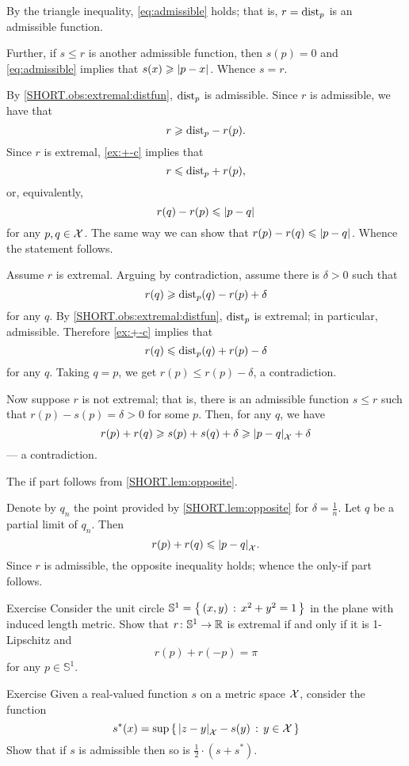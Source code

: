 By the triangle inequality, \ref{eq:admissible} holds;
that is, $r=\mathrm{dist}_p$ is an admissible function.

Further, if $s\le r$ is another admissible function, then $s(p)=0$ and \ref{eq:admissible} implies that $s(x)\z\ge\dist{p}{x}{}$.
Whence $s=r$.

By \ref{SHORT.obs:extremal:distfun}, $\mathrm{dist}_p$ is admissible.
Since $r$ is admissible, we have that
\[r\geqslant \mathrm{dist}_p-r(p).\]
Since $r$ is extremal, \ref{ex:+-c} implies that
\[r\leqslant \mathrm{dist}_p+r(p),\]
or, equivalently,
\[r(q)-r(p)\le \dist{p}{q}{}\]
for any $p,q\in\mathcal{X}$.
The same way we can show that
$r(p)-r(q)\le \dist{p}{q}{}$.
Whence the statement follows.

Assume $r$ is extremal.
Arguing by contradiction, assume there is $\delta>0$ such that
\[r(q)\geqslant \mathrm{dist}_p(q)-r(p)+\delta\]
for any $q$.
By \ref{SHORT.obs:extremal:distfun}, $\mathrm{dist}_p$ is extremal; in particular, admissible.
Therefore \ref{ex:+-c} implies that
\[r(q)\leqslant \mathrm{dist}_p(q)+r(p)-\delta\]
for any $q$.
Taking $q=p$, we get $r(p)\le r(p)-\delta$, a contradiction.

Now suppose $r$ is not extremal; that is, there is an admissible function $s\le r$ such that $r(p)-s(p)=\delta>0$ for some $p$.
Then, for any $q$, we have
\[r(p)+r(q)\ge s(p)+s(q)+\delta\ge \dist{p}{q}{\spc{X}}+\delta\]
--- a contradiction.

The if part follows from \ref{SHORT.lem:opposite}.

Denote by $q_n$ the point provided by \ref{SHORT.lem:opposite} for $\delta=\tfrac1n$.
Let $q$ be a partial limit of $q_n$. 
Then 
\[r(p)+r(q)\le\dist{p}{q}{\spc{X}}.\]
Since $r$ is admissible, the opposite inequality holds;
whence the only-if part follows.
\qeds

\begin{thm}{Exercise}\label{ex:circle}
Consider the unit circle $\mathbb{S}^1=\left\{\,{(x,y)}\,:\,{x^2+y^2=1}\,\right\}$ in the plane with induced length metric.
Show that $r\colon\mathbb{S}^1\to\mathbb{R}$ is extremal if and only if it is 1-Lipschitz and 
\[r(p)+r(-p)=\pi\] for any $p\in\mathbb{S}^1$.
\end{thm}

\begin{thm}{Exercise}\label{ex:retraction}
Given a real-valued function $s$ on a metric space $\mathcal{X}$,
consider the function
\[s^*(x)=\sup\set{\dist{z}{y}{\spc{X}}-s(y)}{y\in \spc{X}}\]
Show that if $s$ is admissible then so is $\tfrac12\cdot(s+s^*)$.
\end{thm}






